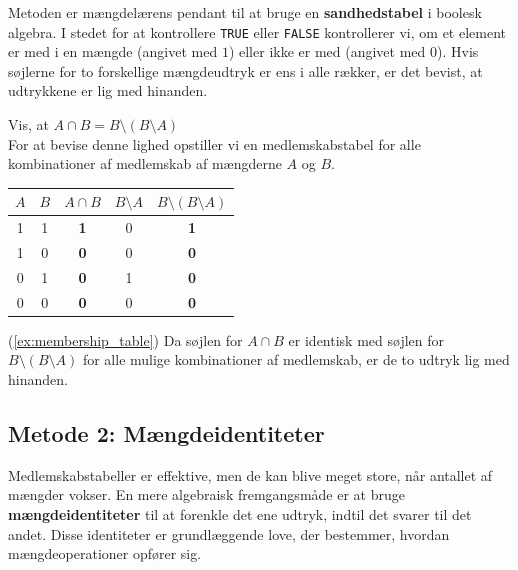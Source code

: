 Metoden er mængdelærens pendant til at bruge en \textbf{sandhedstabel} i boolesk algebra. I stedet for at kontrollere \texttt{TRUE} eller \texttt{FALSE} kontrollerer vi, om et element er med i en mængde (angivet med $1$) eller ikke er med (angivet med $0$). Hvis søjlerne for to forskellige mængdeudtryk er ens i alle rækker, er det bevist, at udtrykkene er lig med hinanden.

\begin{example}{Vis, at $A \cap B = B \setminus (B \setminus A)$}\\
    For at bevise denne lighed opstiller vi en medlemskabstabel for alle kombinationer af medlemskab af mængderne $A$ og $B$.
    
    \begin{center}
    \renewcommand{\arraystretch}{1.5}
    \begin{tabular}{|c|c||c|c|c|}
        \hline
        $A$ & $B$ & $A \cap B$ & $B \setminus A$ & $B \setminus (B \setminus A)$ \\
        \hline
        1 & 1 & \textbf{1} & 0 & \textbf{1} \\
        1 & 0 & \textbf{0} & 0 & \textbf{0} \\
        0 & 1 & \textbf{0} & 1 & \textbf{0} \\
        0 & 0 & \textbf{0} & 0 & \textbf{0} \\
        \hline
    \end{tabular}
    \end{center}
    \label{ex:membership_table}

\begin{solution} (\autoref{ex:membership_table}) Da søjlen for $A \cap B$ er identisk med søjlen for $B \setminus (B \setminus A)$ for alle mulige kombinationer af medlemskab, er de to udtryk lig med hinanden.
\end{solution}

\end{example}



\subsection*{Metode 2: Mængdeidentiteter}
Medlemskabstabeller er effektive, men de kan blive meget store, når antallet af mængder vokser. En mere algebraisk fremgangsmåde er at bruge \textbf{mængdeidentiteter} til at forenkle det ene udtryk, indtil det svarer til det andet. Disse identiteter er grundlæggende love, der bestemmer, hvordan mængdeoperationer opfører sig.

